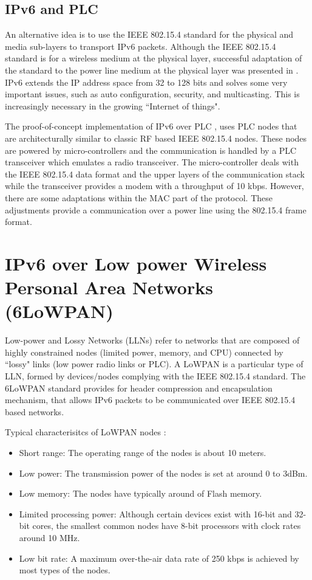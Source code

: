 \subsection{IPv6 and PLC}

An alternative idea is to use the IEEE 802.15.4 standard \cite{IEEE_802.15} for the physical and media sub-layers to transport IPv6 packets. Although the IEEE 802.15.4 standard is for a wireless medium at the physical layer, successful adaptation of the standard to the power line medium at the physical layer was presented in \cite{IP_PLC}. IPv6 extends the IP address space from 32 to 128 bits and solves some very important issues, such as auto configuration, security, and multicasting. This is increasingly necessary in the growing ``Internet of things".

The proof-of-concept implementation of IPv6 over PLC \cite{IP_PLC}, uses PLC nodes that are architecturally similar to classic RF based IEEE 802.15.4 nodes. These nodes are powered by micro-controllers and the communication is handled by a PLC transceiver which emulates a radio transceiver. The micro-controller deals with the IEEE 802.15.4 data format and the upper layers of the communication stack while the transceiver provides a modem with a throughput of 10 kbps. However, there are some adaptations within the MAC part of the protocol. These adjustments provide a communication over a power line using the 802.15.4 frame format. 

\section{IPv6 over Low power Wireless Personal Area Networks (6LoWPAN)}

Low-power and Lossy Networks (LLNs) refer to networks that are composed of highly constrained nodes (limited power, memory, and CPU) connected by ``lossy" links (low power radio links or PLC). A LoWPAN is a particular type of LLN, formed by devices/nodes complying with the IEEE 802.15.4 standard. The 6LoWPAN standard provides for header compression and encapsulation mechanism, that allows IPv6 packets to be communicated over IEEE 802.15.4 based networks.

Typical characterisitcs of LoWPAN nodes \cite{6LPN_dna_draft,6LPN_prob_rfc}:
\begin{itemize}
\item Short range: The operating range of the nodes is about 10 meters.
\item Low power: The transmission power of the nodes is set at around 0 to 3dBm.
\item Low memory: The nodes have typically around  of Flash memory.
\item Limited processing power: Although certain devices exist with 16-bit and 32-bit cores, the smallest common nodes have 8-bit processors with clock rates around 10 MHz.
\item Low bit rate: A maximum over-the-air data rate of 250 kbps is achieved by most types of the nodes.
\end{itemize}

